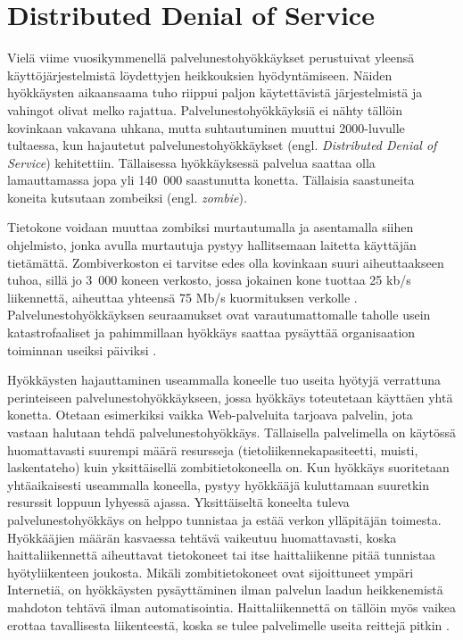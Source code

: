 \section{Distributed Denial of Service}

Vielä viime vuosikymmenellä palvelunestohyökkäykset perustuivat
yleensä käyttöjärjestelmistä löydettyjen heikkouksien
hyödyntämiseen. Näiden hyökkäysten aikaansaama tuho riippui paljon
käytettävistä järjestelmistä ja vahingot olivat melko
rajattua. Palvelunestohyökkäyksiä ei nähty tällöin kovinkaan vakavana
uhkana, mutta suhtautuminen muuttui 2000-luvulle tultaessa, kun
hajautetut palvelunestohyökkäykset (engl. \textit{Distributed Denial
of Service}) kehitettiin. Tällaisessa hyökkäyksessä palvelua saattaa
olla lamauttamassa jopa yli 140~000 saastunutta konetta. Tällaisia
saastuneita koneita kutsutaan zombeiksi (engl. \textit{zombie}).

Tietokone voidaan muuttaa zombiksi murtautumalla ja asentamalla siihen
ohjelmisto, jonka avulla murtautuja pystyy hallitsemaan laitetta
käyttäjän tietämättä. Zombiverkoston ei tarvitse edes olla kovinkaan
suuri aiheuttaakseen tuhoa, sillä jo 3~000 koneen verkosto, jossa
jokainen kone tuottaa 25 kb/s liikennettä, aiheuttaa yhteensä 75 Mb/s
kuormituksen verkolle \cite{Hacking}.  Palvelunestohyökkäyksen
seuraamukset ovat varautumattomalle taholle usein katastrofaaliset ja
pahimmillaan hyökkäys saattaa pysäyttää organisaation toiminnan
useiksi päiviksi \cite{CERT}.

Hyökkäysten hajauttaminen useammalla koneelle tuo useita hyötyjä
verrattuna perinteiseen palvelunestohyökkäykseen, jossa hyökkäys
toteutetaan käyttäen yhtä konetta. Otetaan esimerkiksi vaikka
Web-palveluita tarjoava palvelin, jota vastaan halutaan tehdä
palvelunestohyökkäys. Tällaisella palvelimella on käytössä
huomattavasti suurempi määrä resursseja (tietoliikennekapasiteetti,
muisti, laskentateho) kuin yksittäisellä zombitietokoneella on. Kun
hyökkäys suoritetaan yhtäaikaisesti useammalla koneella, pystyy
hyökkääjä kuluttamaan suuretkin resurssit loppuun lyhyessä
ajassa. Yksittäiseltä koneelta tuleva palvelunestohyökkäys on helppo
tunnistaa ja estää verkon ylläpitäjän toimesta. Hyökkääjien määrän
kasvaessa tehtävä vaikeutuu huomattavasti, koska haittaliikennettä
aiheuttavat tietokoneet tai itse haittaliikenne pitää tunnistaa
hyötyliikenteen joukosta. Mikäli zombitietokoneet ovat sijoittuneet ympäri
Internetiä, on hyökkäysten pysäyttäminen ilman palvelun laadun heikkenemistä
mahdoton tehtävä ilman automatisointia. Haittaliikennettä on tällöin myös
vaikea erottaa tavallisesta liikenteestä, koska se tulee palvelimelle
useita reittejä pitkin \cite{DDOS}.

